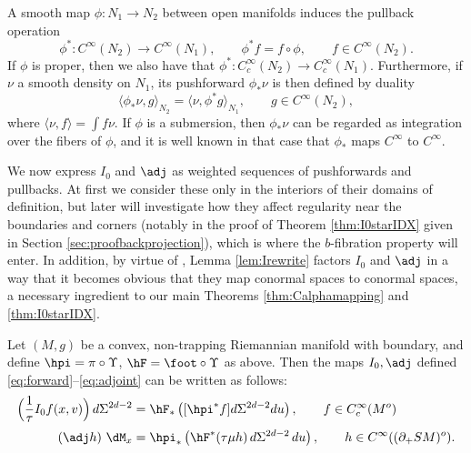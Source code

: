  \label{sec:compounds}

A smooth map $\phi:N_1\to N_2$ between open manifolds induces the pullback operation
\begin{equation*}
\phi^*\colon C^\infty(N_2) \to C^\infty(N_1), \qquad \phi^* f = f\circ \phi, \qquad f\in C^\infty(N_2).
\end{equation*}
If $\phi$ is proper, then we also have that $\phi^*\colon C_c^{\infty}(N_2)\to C_c^{\infty}(N_1)$. Furthermore, if $\nu$ a smooth
density on $N_1$, its pushforward $\phi_*\nu$ is then defined by duality
\begin{equation*}
\langle \phi_* \nu, g \rangle_{N_2} = \langle \nu, \phi^* g \rangle_{N_1}, \qquad g\in C^\infty(N_2),
\end{equation*}
where $\langle \nu, f\rangle = \int f \nu$. If $\phi$ is a submersion, then $\phi_* \nu$ can be regarded
as integration over the fibers of $\phi$, and it is well known in that case that $\phi_*$ maps $C^\infty$ to $C^\infty$.

We now express $I_0$ and $\adj $ as weighted sequences of pushforwards and pullbacks. At first we consider these only in the interiors of their domains of definition, but later will investigate how they affect regularity near the boundaries and corners (notably in the proof of Theorem \ref{thm:I0starIDX} given in Section \ref{sec:proofbackprojection}), which is where the $b$-fibration property will enter. In addition, by virtue of \cite[Th.\,3 \& 5]{Melrose1992}, Lemma \ref{lem:Irewrite} factors $I_0$ and $\adj$ in a way that it becomes obvious that they map conormal spaces to conormal spaces, a necessary ingredient to our main Theorems \ref{thm:Calphamapping} and \ref{thm:I0starIDX}.

\begin{Lemma}\label{lem:Irewrite}
Let $(M,g)$ be a convex, non-trapping Riemannian manifold with boundary, and define $\hpi = \pi\circ\Upsilon$,
$\hF = \foot\circ\Upsilon$ as above.
Then the maps $I_0, \adj $ defined \eqref{eq:forward}--\eqref{eq:adjoint} can be written as follows:
\begin{align}
\Bigl(\frac{1}{\tau} I_0 f(x,v) \Bigr)\, d\Sigma^{2d-2} &= \hF_* \left([\hpi^* f]d\Sigma^{2d-2} du \right), \qquad f\in C_{c}^\infty(M^{o}) \label{eq:I0} \\[0.5ex]
(\adj h)\ \dM_x &= \hpi_* \left(\hF^* (\tau\mu h)\,d\Sigma^{2d-2}\,du\right), \qquad h\in C^\infty((\partial_+ SM)^{o}). \label{eq:I0star}
\end{align}
\end{Lemma}

